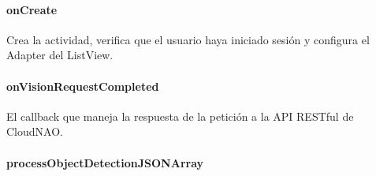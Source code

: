 \paragraph{onCreate}
\label{\detokenize{dev_docs:id31}}

\begin{fulllineitems}
\label{\detokenize{dev_docs:com.lar.cloudnao.ObjectDetectionActivity.onCreate(Bundle)}}
Crea la actividad, verifica que el usuario haya iniciado sesión y configura el Adapter del ListView.

\end{fulllineitems}



\paragraph{onVisionRequestCompleted}
\label{\detokenize{dev_docs:id32}}

\begin{fulllineitems}
\label{\detokenize{dev_docs:com.lar.cloudnao.ObjectDetectionActivity.onVisionRequestCompleted(Object)}}
El callback que maneja la respuesta de la petición a la API RESTful de CloudNAO.

\end{fulllineitems}



\paragraph{processObjectDetectionJSONArray}
\label{\detokenize{dev_docs:processobjectdetectionjsonarray}}

